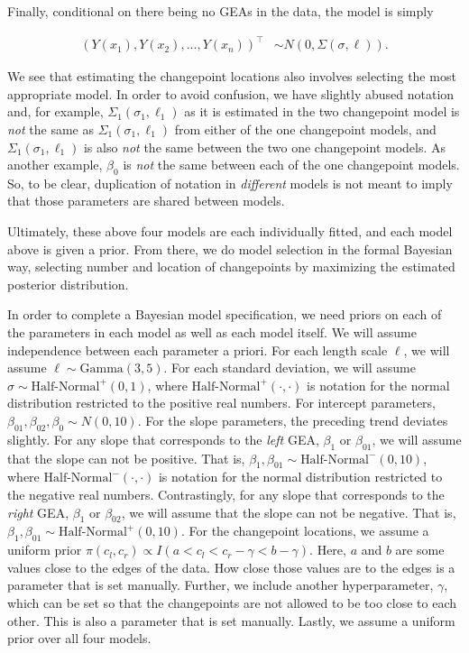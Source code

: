 \documentclass[12pt]{article}
\begin{document}
\noindent Finally, conditional on there being no GEAs in the data, the
model is simply

\begin{align}
(Y(x_{1}), Y(x_{2}), ..., Y(x_{n}))^{\top} &\sim N(0, \Sigma(\sigma, \ell)).
\end{align}

We see that estimating the changepoint locations also involves selecting
the most appropriate model. In order to avoid confusion, we have
slightly abused notation and, for example,
\(\Sigma_1(\sigma_1, \ell_1)\) as it is estimated in the two changepoint
model is \emph{not} the same as \(\Sigma_1(\sigma_1, \ell_1)\) from
either of the one changepoint models, and \(\Sigma_1(\sigma_1, \ell_1)\)
is also \emph{not} the same between the two one changepoint models. As
another example, \(\beta_0\) is \emph{not} the same between each of the
one changepoint models. So, to be clear, duplication of notation in
\emph{different} models is not meant to imply that those parameters are
shared between models.

Ultimately, these above four models are each individually fitted, and
each model above is given a prior. From there, we do model selection in
the formal Bayesian way, selecting number and location of changepoints
by maximizing the estimated posterior distribution.

In order to complete a Bayesian model specification, we need priors on
each of the parameters in each model as well as each model itself. We
will assume independence between each parameter a priori. For each
length scale \(\ell\), we will assume \(\ell \sim \text{Gamma}(3,5)\).
For each standard deviation, we will assume
\(\sigma \sim \text{Half-Normal}^{+}(0,1)\), where
\(\text{Half-Normal}^{+}(\cdot,\cdot)\) is notation for the normal
distribution restricted to the positive real numbers. For intercept
parameters, \(\beta_{01}, \beta_{02}, \beta_0 \sim N(0, 10)\). For the
slope parameters, the preceding trend deviates slightly. For any slope
that corresponds to the \emph{left} GEA, \(\beta_1\) or \(\beta_{01}\),
we will assume that the slope can not be positive. That is,
\(\beta_1, \beta_{01} \sim \text{Half-Normal}^{-}(0,10)\), where
\(\text{Half-Normal}^{-}(\cdot, \cdot)\) is notation for the normal
distribution restricted to the negative real numbers. Contrastingly, for
any slope that corresponds to the \emph{right} GEA, \(\beta_1\) or
\(\beta_{02}\), we will assume that the slope can not be negative. That
is, \(\beta_1, \beta_{01} \sim \text{Half-Normal}^{+}(0,10)\). For the
changepoint locations, we assume a uniform prior
\(\pi(c_l, c_r) \propto I(a < c_l < c_r - \gamma < b - \gamma)\). Here,
\(a\) and \(b\) are some values close to the edges of the data. How
close those values are to the edges is a parameter that is set manually.
Further, we include another hyperparameter, \(\gamma\), which can be set
so that the changepoints are not allowed to be too close to each other.
This is also a parameter that is set manually. Lastly, we assume a
uniform prior over all four models.
\end{document}
